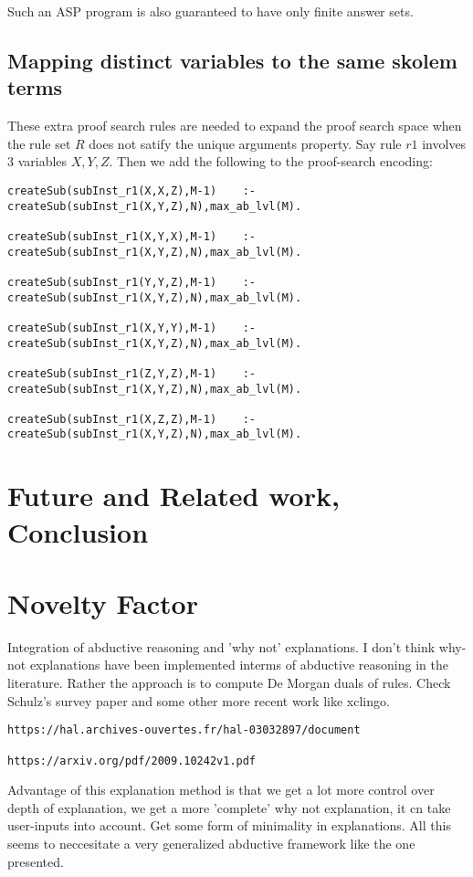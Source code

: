 \documentclass[sigconf]{acmart}
\begin{document}
Such an ASP program is also guaranteed to have only finite answer sets.

\subsection{Mapping distinct variables to the same skolem terms}
These extra proof search rules are needed to expand the proof search space when the rule set $R$ does not satify the unique arguments property. Say rule $r1$ involves 3 variables $X, Y, Z$. Then we add the following to the proof-search encoding:
\begin{verbatim}
createSub(subInst_r1(X,X,Z),M-1)    :-createSub(subInst_r1(X,Y,Z),N),max_ab_lvl(M).

createSub(subInst_r1(X,Y,X),M-1)    :-createSub(subInst_r1(X,Y,Z),N),max_ab_lvl(M).

createSub(subInst_r1(Y,Y,Z),M-1)    :-createSub(subInst_r1(X,Y,Z),N),max_ab_lvl(M).

createSub(subInst_r1(X,Y,Y),M-1)    :-createSub(subInst_r1(X,Y,Z),N),max_ab_lvl(M).

createSub(subInst_r1(Z,Y,Z),M-1)    :-createSub(subInst_r1(X,Y,Z),N),max_ab_lvl(M).

createSub(subInst_r1(X,Z,Z),M-1)    :-createSub(subInst_r1(X,Y,Z),N),max_ab_lvl(M).
\end{verbatim}

\section{Future and Related work, Conclusion}\label{sec:conclusion}
\section{Novelty Factor}
Integration of abductive reasoning and 'why not' explanations. I don't think why-not explanations have been implemented interms of abductive reasoning in the literature. Rather the approach is to compute De Morgan duals of rules. Check Schulz's survey paper and some other more recent work like xclingo. 
\begin{verbatim}
https://hal.archives-ouvertes.fr/hal-03032897/document

https://arxiv.org/pdf/2009.10242v1.pdf
\end{verbatim}
Advantage of this explanation method is that we get a lot more control over depth of explanation, we get a more 'complete' why not explanation, it cn take user-inputs into account. Get some form of minimality in explanations. All this seems to neccesitate a very generalized abductive framework like the one presented.
\end{document}
